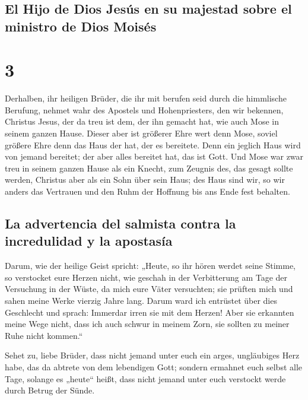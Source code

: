 \hypertarget{el-hijo-de-dios-jesuxfas-en-su-majestad-sobre-el-ministro-de-dios-moisuxe9s}{%
\subsection{El Hijo de Dios Jesús en su majestad sobre el ministro de
Dios
Moisés}\label{el-hijo-de-dios-jesuxfas-en-su-majestad-sobre-el-ministro-de-dios-moisuxe9s}}

\hypertarget{section-2}{%
\section{3}\label{section-2}}

 Derhalben, ihr heiligen Brüder, die ihr mit berufen seid
durch die himmlische Berufung, nehmet wahr des Apostels und
Hohenpriesters, den wir bekennen, Christus Jesus,  der da
treu ist dem, der ihn gemacht hat, wie auch Mose in seinem ganzen Hause.
 Dieser aber ist größerer Ehre wert denn Mose, soviel
größere Ehre denn das Haus der hat, der es bereitete. 
Denn ein jeglich Haus wird von jemand bereitet; der aber alles bereitet
hat, das ist Gott.  Und Mose war zwar treu in seinem
ganzen Hause als ein Knecht, zum Zeugnis des, das gesagt sollte werden,
 Christus aber als ein Sohn über sein Haus; des Haus sind
wir, so wir anders das Vertrauen und den Ruhm der Hoffnung bis ans Ende
fest behalten.

\hypertarget{la-advertencia-del-salmista-contra-la-incredulidad-y-la-apostasuxeda}{%
\subsection{La advertencia del salmista contra la incredulidad y la
apostasía}\label{la-advertencia-del-salmista-contra-la-incredulidad-y-la-apostasuxeda}}

 Darum, wie der heilige Geist spricht: „Heute, so ihr
hören werdet seine Stimme,  so verstocket eure Herzen
nicht, wie geschah in der Verbitterung am Tage der Versuchung in der
Wüste,  da mich eure Väter versuchten; sie prüften mich
und sahen meine Werke vierzig Jahre lang.  Darum ward ich
entrüstet über dies Geschlecht und sprach: Immerdar irren sie mit dem
Herzen! Aber sie erkannten meine Wege nicht,  dass ich
auch schwur in meinem Zorn, sie sollten zu meiner Ruhe nicht kommen.``

 Sehet zu, liebe Brüder, dass nicht jemand unter euch ein
arges, ungläubiges Herz habe, das da abtrete von dem lebendigen Gott;
 sondern ermahnet euch selbst alle Tage, solange es
„heute`` heißt, dass nicht jemand unter euch verstockt werde durch
Betrug der Sünde.

